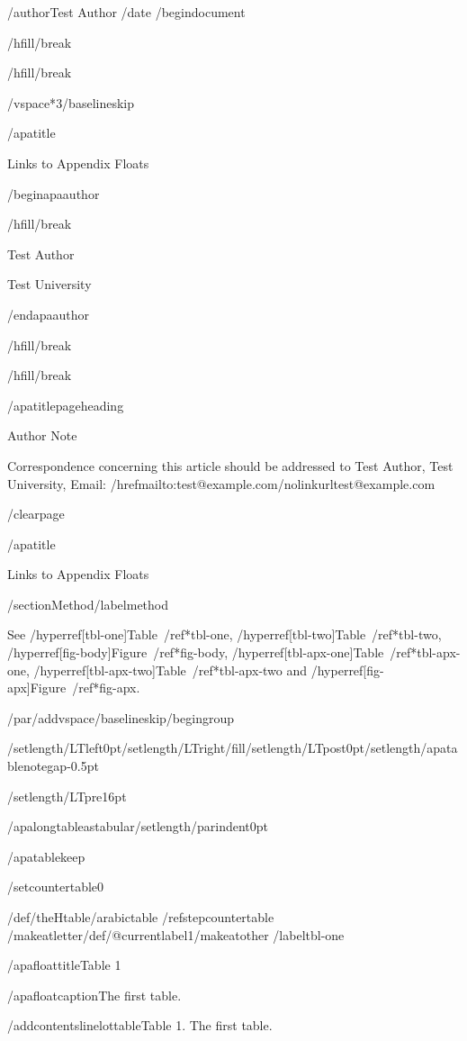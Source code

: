 /author{Test Author}
/date{}
/begin{document}


/hfill/break

/hfill/break

/vspace*{3/baselineskip}

/apatitle{

Links to Appendix Floats

}

/begin{apaauthor}

/hfill/break

Test Author

Test University

/end{apaauthor}

/hfill/break

/hfill/break

/apatitlepageheading{

Author Note

}

Correspondence concerning this article should be addressed to Test
Author, Test University, Email:
/href{mailto:test@example.com}{/nolinkurl{test@example.com}}

/clearpage

/apatitle{

Links to Appendix Floats

}

/section{Method}/label{method}

See /hyperref[tbl-one]{Table~/ref*{tbl-one}},
/hyperref[tbl-two]{Table~/ref*{tbl-two}},
/hyperref[fig-body]{Figure~/ref*{fig-body}},
/hyperref[tbl-apx-one]{Table~/ref*{tbl-apx-one}},
/hyperref[tbl-apx-two]{Table~/ref*{tbl-apx-two}} and
/hyperref[fig-apx]{Figure~/ref*{fig-apx}}.

/par/addvspace{/baselineskip}/begingroup

/setlength{/LTleft}{0pt}/setlength{/LTright}{/fill}/setlength{/LTpost}{0pt}/setlength{/apatablenotegap}{-0.5pt}

/setlength{/LTpre}{16pt}

/apalongtableastabular/setlength{/parindent}{0pt}

/apatablekeep

/setcounter{table}{0}

/def/theHtable{/arabic{table}}%
/refstepcounter{table}%
/makeatletter/def/@currentlabel{1}/makeatother%
/label{tbl-one}

/apafloattitle{Table 1}

/apafloatcaption{The first table.}

/addcontentsline{lot}{table}{Table 1. The first table.}

